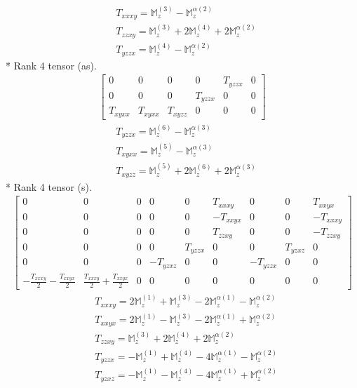\documentclass[fleqn,8pt,landscape]{jsarticle}
\begin{document}
\begin{align*}
& T_{xxxy} = \mathbb{M}_{z}^{(3)} - \mathbb{M}_{z}^{\alpha(2)} \\
& T_{zzxy} = \mathbb{M}_{z}^{(3)} + 2 \mathbb{M}_{z}^{(4)} + 2 \mathbb{M}_{z}^{\alpha(2)} \\
& T_{yzzx} = \mathbb{M}_{z}^{(4)} - \mathbb{M}_{z}^{\alpha(2)}
\end{align*}
* Rank 4 tensor (as).
\begin{align*}
\begin{bmatrix} 0 & 0 & 0 & 0 & T_{yzzx} & 0 \\ 0 & 0 & 0 & T_{yzzx} & 0 & 0 \\ T_{xyxx} & T_{xyxx} & T_{xyzz} & 0 & 0 & 0 \end{bmatrix}
\end{align*}
\begin{align*}
& T_{yzzx} = \mathbb{M}_{z}^{(6)} - \mathbb{M}_{z}^{\alpha(3)} \\
& T_{xyxx} = \mathbb{M}_{z}^{(5)} - \mathbb{M}_{z}^{\alpha(3)} \\
& T_{xyzz} = \mathbb{M}_{z}^{(5)} + 2 \mathbb{M}_{z}^{(6)} + 2 \mathbb{M}_{z}^{\alpha(3)}
\end{align*}
* Rank 4 tensor (s).
\begin{align*}
\begin{bmatrix} 0 & 0 & 0 & 0 & 0 & T_{xxxy} & 0 & 0 & T_{xxyx} \\ 0 & 0 & 0 & 0 & 0 & - T_{xxyx} & 0 & 0 & - T_{xxxy} \\ 0 & 0 & 0 & 0 & 0 & T_{zzxy} & 0 & 0 & - T_{zzxy} \\ 0 & 0 & 0 & 0 & T_{yzzx} & 0 & 0 & T_{yzxz} & 0 \\ 0 & 0 & 0 & - T_{yzxz} & 0 & 0 & - T_{yzzx} & 0 & 0 \\ - \frac{T_{xxxy}}{2} - \frac{T_{xxyx}}{2} & \frac{T_{xxxy}}{2} + \frac{T_{xxyx}}{2} & 0 & 0 & 0 & 0 & 0 & 0 & 0 \end{bmatrix}
\end{align*}
\begin{align*}
& T_{xxxy} = 2 \mathbb{M}_{z}^{(1)} + \mathbb{M}_{z}^{(3)} - 2 \mathbb{M}_{z}^{\alpha(1)} - \mathbb{M}_{z}^{\alpha(2)} \\
& T_{xxyx} = 2 \mathbb{M}_{z}^{(1)} - \mathbb{M}_{z}^{(3)} - 2 \mathbb{M}_{z}^{\alpha(1)} + \mathbb{M}_{z}^{\alpha(2)} \\
& T_{zzxy} = \mathbb{M}_{z}^{(3)} + 2 \mathbb{M}_{z}^{(4)} + 2 \mathbb{M}_{z}^{\alpha(2)} \\
& T_{yzzx} = - \mathbb{M}_{z}^{(1)} + \mathbb{M}_{z}^{(4)} - 4 \mathbb{M}_{z}^{\alpha(1)} - \mathbb{M}_{z}^{\alpha(2)} \\
& T_{yzxz} = - \mathbb{M}_{z}^{(1)} - \mathbb{M}_{z}^{(4)} - 4 \mathbb{M}_{z}^{\alpha(1)} + \mathbb{M}_{z}^{\alpha(2)}
\end{align*}
\end{document}
